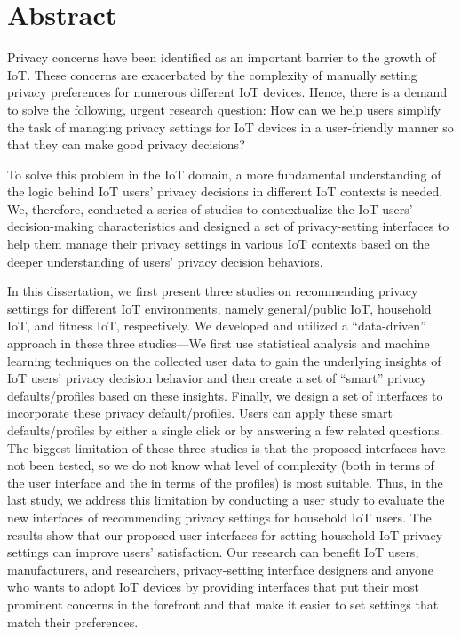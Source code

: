 \chapter*{Abstract}
Privacy concerns have been identified as an important barrier to the growth of IoT. These concerns are exacerbated by the complexity of manually setting privacy preferences for numerous different IoT devices. Hence, there is a demand to solve the following, urgent research question: How can we help users simplify the task of managing privacy settings for IoT devices in a user-friendly manner so that they can make good privacy decisions?

To solve this problem in the IoT domain, a more fundamental understanding of the logic behind IoT users' privacy decisions in different IoT contexts is needed. We, therefore, conducted a series of studies to contextualize the IoT users' decision-making characteristics and designed a set of privacy-setting interfaces to help them manage their privacy settings in various IoT contexts based on the deeper understanding of users' privacy decision behaviors. 

In this dissertation, we first present three studies on recommending privacy settings for different IoT environments, namely general/public IoT, household IoT, and fitness IoT, respectively. We developed and utilized a ``data-driven” approach in these three studies—We first use statistical analysis and machine learning techniques on the collected user data to gain the underlying insights of IoT users' privacy decision behavior and then create a set of ``smart” privacy defaults/profiles based on these insights. Finally, we design a set of interfaces to incorporate these privacy default/profiles. Users can apply these smart defaults/profiles by either a single click or by answering a few related questions. The biggest limitation of these three studies is that the proposed interfaces have not been tested, so we do not know what level of complexity (both in terms of the user interface and the in terms of the profiles) is most suitable. Thus, in the last study, we address this limitation by conducting a user study to evaluate the new interfaces of recommending privacy settings for household IoT users. The results show that our proposed user interfaces for setting household IoT privacy settings can improve users' satisfaction. Our research can benefit IoT users, manufacturers, and researchers, privacy-setting interface designers and anyone who wants to adopt IoT devices by providing interfaces that put their most prominent concerns in the forefront and that make it easier to set settings that match their preferences.

